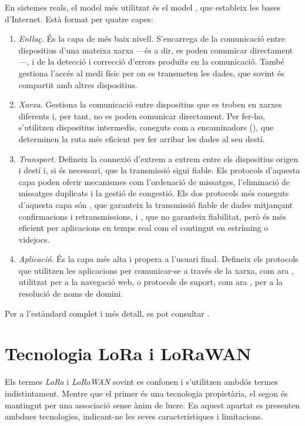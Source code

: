 \documentclass{tfgitic}[2024/07/01]
\begin{document}
En sistemes reals, el model més utilitzat és el model , que estableix les bases d'Internet. Està format per quatre capes:
\begin{enumerate}
    \item \emph{Enllaç}. És la capa de més baix nivell. S'encarrega de la comunicació entre dispositius d'una mateixa xarxa ---és a dir, es poden comunicar directament---, i de la detecció i correcció d'errors produïts en la comunicació. També gestiona l'accés al medi físic per on es transmeten les dades, que sovint és compartit amb altres dispositius.
    \item \emph{Xarxa}. Gestiona la comunicació entre dispositius que es troben en xarxes diferents i, per tant, no es poden comunicar directament. Per fer-ho, s'utilitzen dispositius intermedis, coneguts com a encaminadors (), que determinen la ruta més eficient per fer arribar les dades al seu destí.
    \item \emph{Transport}. Defineix la connexió d'extrem a extrem entre els dispositius origen i destí i, si és necessari, que la transmissió sigui fiable. Els protocols d'aquesta capa poden oferir mecanismes com l'ordenació de missatges, l'eliminació de missatges duplicats i la gestió de congestió. Els dos protocols més coneguts d'aquesta capa són , que garanteix la transmissió fiable de dades mitjançant confirmacions i retransmissions, i , que no garanteix fiabilitat, però és més eficient per aplicacions en temps real com el contingut en estríming o videjocs.
    \item \emph{Aplicació}. És la capa més alta i propera a l'usuari final. Defineix els protocols que utilitzen les aplicacions per comunicar-se a través de la xarxa, com ara , utilitzat per a la navegació web, o protocols de suport, com ara , per a la resolució de noms de domini.
\end{enumerate}
Per a l'estàndard complet i més detall, es pot consultar \cite{braden_requirements_1989}. 

\section{Tecnologia LoRa i LoRaWAN}
Els termes \emph{LoRa} i \emph{LoRaWAN} sovint es confonen i s'utilitzen ambdós termes indistintament. Mentre que el primer és una tecnologia propietària, el segon és mantingut per una associació sense ànim de lucre. En aquest apartat es presenten ambdues tecnologies, indicant-ne les seves característiques i limitacions.
\end{document}
